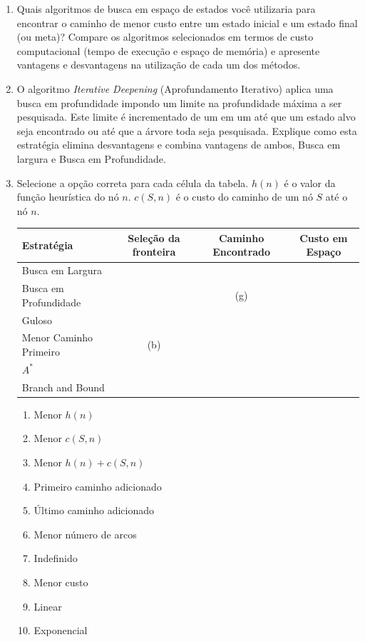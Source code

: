 \documentclass{article}
\begin{document}
\begin{enumerate}
    
    \item Quais algoritmos de busca em espaço de estados você utilizaria para encontrar o caminho de menor custo entre um estado inicial e um estado final (ou meta)? Compare os algoritmos selecionados em termos de custo computacional (tempo de execução e espaço de memória) e apresente vantagens e desvantagens na utilização de cada um dos métodos. 

    \item  O algoritmo \textit{Iterative Deepening} (Aprofundamento Iterativo) aplica uma busca em profundidade impondo um limite na profundidade máxima a ser pesquisada. Este limite é incrementado de um em um até que um estado alvo seja encontrado ou até que a árvore toda seja pesquisada. Explique como esta estratégia elimina desvantagens e combina vantagens de ambos, Busca em largura e Busca em Profundidade.
    
    
    \item Selecione a opção correta para cada célula da tabela. $h(n)$ é o valor da função heurística do nó $n$. $c(S,n)$ é o custo do caminho de um nó $S$ até o nó $n$.
    
    \begin{center}
        \begin{tabular}{|l|c|c|c|}
        \hline
        Estratégia            & Seleção da fronteira & Caminho Encontrado & Custo em Espaço \\
        \hline
        Busca em Largura      &     &   &   \\
        \hline
        Busca em Profundidade &     & (g)  &   \\
        \hline
        Guloso                &     &   &   \\
        \hline
        Menor Caminho Primeiro& (b) &   &   \\
        \hline
        $A^*$                 &     &   &   \\
        \hline
        Branch and Bound      &     &   &   \\
        \hline
    \end{tabular}
    \end{center}
    
    \begin{enumerate}
        \item Menor $h(n)$
        \item Menor $c(S,n)$
        \item Menor $h(n) + c(S,n)$
        \item Primeiro caminho adicionado 
        \item Último caminho adicionado 
        \item Menor número de arcos
        \item Indefinido
        \item Menor custo
        \item Linear 
        \item Exponencial
    \end{enumerate}
    

\end{enumerate}
\end{document}
